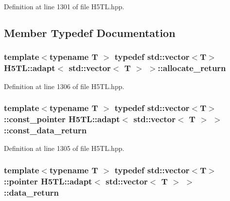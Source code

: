 Definition at line 1301 of file H5\-T\-L.\-hpp.



\subsection{Member Typedef Documentation}
\hypertarget{struct_h5_t_l_1_1adapt_3_01std_1_1vector_3_01_t_01_4_01_4_a47c3e4fd67d82123fd8f2c9754502af6}{
\subsubsection[{allocate\-\_\-return}]{\setlength{\rightskip}{0pt plus 5cm}template$<$typename T $>$ typedef std\-::vector$<$T$>$ {\bf H5\-T\-L\-::adapt}$<$ std\-::vector$<$ T $>$ $>$\-::{\bf allocate\-\_\-return}}}\label{struct_h5_t_l_1_1adapt_3_01std_1_1vector_3_01_t_01_4_01_4_a47c3e4fd67d82123fd8f2c9754502af6}


Definition at line 1306 of file H5\-T\-L.\-hpp.

\hypertarget{struct_h5_t_l_1_1adapt_3_01std_1_1vector_3_01_t_01_4_01_4_a51278a88e3f610f935350365d0d5102b}{
\subsubsection[{const\-\_\-data\-\_\-return}]{\setlength{\rightskip}{0pt plus 5cm}template$<$typename T $>$ typedef std\-::vector$<$T$>$\-::const\-\_\-pointer {\bf H5\-T\-L\-::adapt}$<$ std\-::vector$<$ T $>$ $>$\-::{\bf const\-\_\-data\-\_\-return}}}\label{struct_h5_t_l_1_1adapt_3_01std_1_1vector_3_01_t_01_4_01_4_a51278a88e3f610f935350365d0d5102b}


Definition at line 1305 of file H5\-T\-L.\-hpp.

\hypertarget{struct_h5_t_l_1_1adapt_3_01std_1_1vector_3_01_t_01_4_01_4_a8ac9e6d104013a192b80a732918852ec}{
\subsubsection[{data\-\_\-return}]{\setlength{\rightskip}{0pt plus 5cm}template$<$typename T $>$ typedef std\-::vector$<$T$>$\-::pointer {\bf H5\-T\-L\-::adapt}$<$ std\-::vector$<$ T $>$ $>$\-::{\bf data\-\_\-return}}}\label{struct_h5_t_l_1_1adapt_3_01std_1_1vector_3_01_t_01_4_01_4_a8ac9e6d104013a192b80a732918852ec}


